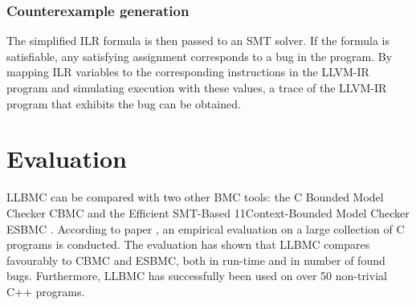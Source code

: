 \documentclass[14pt]{article}
\begin{document}
  
  \subsubsection{Counterexample generation}\label{Counterexample generation} The simplified ILR formula is then passed to an SMT solver. If the formula is satisfiable, any satisfying assignment corresponds to a bug in the program. By mapping ILR variables to the corresponding instructions in the LLVM-IR program and simulating execution with these values, a trace of the LLVM-IR program that exhibits the bug can be obtained. 
  
  
\section{Evaluation}\label{Evaluation}
LLBMC can be compared with two other BMC tools: the C Bounded Model Checker CBMC  \cite{CBMC} and the Efficient SMT-Based
11Context-Bounded Model Checker ESBMC  \cite{ESBMC}. According to paper \cite{llbmc0},  an empirical evaluation on a large collection of C programs is conducted.  The evaluation has shown that LLBMC compares favourably to CBMC and ESBMC, both in run-time and in number of found bugs. Furthermore, LLBMC has successfully been used on over 50 non-trivial C++ programs. 
  
\end{document}

